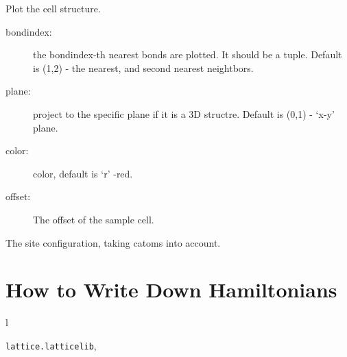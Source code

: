 \documentclass[letterpaper,10pt,oneside,openany]{sphinxmanual}
\begin{document}
\begin{fulllineitems}
\begin{fulllineitems}
\label{index:lattice.lattice.Lattice.showcell}
Plot the cell structure.
\begin{description}
\item[{bondindex:}] \leavevmode
the bondindex-th nearest bonds are plotted. It should be a tuple.
Default is (1,2) - the nearest, and second nearest neightbors.

\item[{plane:}] \leavevmode
project to the specific plane if it is a 3D structre.
Default is (0,1) - `x-y' plane.

\item[{color:}] \leavevmode
color, default is `r' -red.

\item[{offset:}] \leavevmode
The offset of the sample cell.

\end{description}

\end{fulllineitems}


\begin{fulllineitems}
\label{index:lattice.lattice.Lattice.siteconfig}
The site configuration, taking catoms into account.

\end{fulllineitems}


\end{fulllineitems}



\chapter{How to Write Down Hamiltonians}
\label{index:how-to-write-down-hamiltonians}

\renewcommand{\indexname}{Python Module Index}
\begin{theindex}
\def\bigletter#1{{\Large\sffamily#1}\nopagebreak\vspace{1mm}}
\bigletter{l}
\item {\texttt{lattice.latticelib}}, \pageref{index:module-lattice.latticelib}
\end{theindex}

\renewcommand{\indexname}{Index}
\printindex
\end{document}
